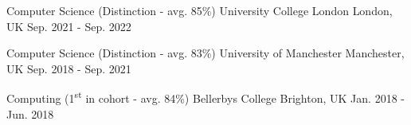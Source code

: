 

\begin{cventries}

  \eduentry
    {Computer Science (Distinction - avg. 85\%)} %
    {University College London} %
    {London, UK} %
    {Sep. 2021 - Sep. 2022} %
    {
    }
    
  \eduentry
    {Computer Science (Distinction - avg. 83\%)} %
    {University of Manchester} %
    {Manchester, UK} %
    {Sep. 2018 - Sep. 2021} %
    {
    }
    
  \eduentry
    {Computing (1\textsuperscript{st} in cohort - avg. 84\%)} %
    {Bellerbys College} %
    {Brighton, UK} %
    {Jan. 2018 - Jun. 2018} %
    {
    }
    

\end{cventries}
